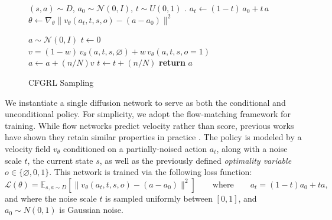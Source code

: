 \documentclass{article}
\begin{document}
\begin{figure}
\vspace*{-4ex}
\begin{minipage}[t]{0.45\textwidth}
\begin{algorithm}[H]
\caption{CFGRL Training}
\begin{algorithmic}
        \STATE {}
        \STATE $(s,a) \sim D$, $\textstyle a_0 \sim \mathcal{N}(0,I)$, $t \sim U(0,1)$
        \STATE {}.
        \STATE {}
        \STATE $a_t \leftarrow (1-t)\,a_0 + t\,a$
        \STATE $\textstyle\theta \leftarrow \nabla_\theta \| v_\theta(a_t, t, s, o) - (a - a_0) \|^2$
   \ENDWHILE
\end{algorithmic}
\end{algorithm}
\end{minipage}
\hfill
\begin{minipage}[t]{0.55\textwidth}
\begin{algorithm}[H]
\caption{CFGRL Sampling}
\begin{algorithmic} %
    \STATE $a \sim \mathcal{N}(0,I)$
    \STATE $t \leftarrow 0$
        \STATE $v = (1-w) \, v_\theta(a, t, s, \varnothing) + w \, v_\theta(a, t, s, o=1)$
        \STATE $a \leftarrow a + (n/N)v$
        \STATE $t \leftarrow t + (n/N)$
    \ENDFOR  %
    \STATE \textbf{return} $a$
\end{algorithmic}
\label{alg:sampling}
\end{algorithm}
\end{minipage}
\end{figure}


We instantiate a single diffusion network to serve as both the conditional and unconditional policy. For simplicity, we adopt the flow-matching framework for training. While flow networks predict velocity rather than score, previous works have shown they retain similar properties in practice \citep{diffusionflow_gao2024, flow_lipman2024}. The policy is modeled by a velocity field $v_\theta$ conditioned on a partially-noised action $a_t$, along with a noise scale $t$, the current state $s$, as well as the previously defined \textit{optimality variable} $o \in \{\varnothing, 0, 1\}$. This network is trained via the following loss function:
\begin{equation}
    \mathcal{L}(\theta) = \mathbb{E}_{s,a \sim D} \left[ \| v_\theta(a_t, t, s,o) - (a-a_0) \|^2 \right] \qquad \text{where} \qquad a_t = (1-t)a_0 + ta,
\end{equation}
and where the noise scale $t$ is sampled uniformly between $[0,1]$, and $a_0 \sim N(0,1)$ is Gaussian noise.
\end{document}
